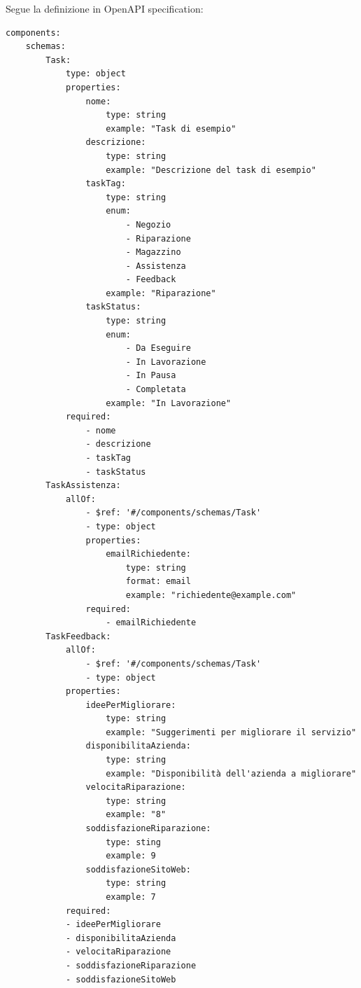 \documentclass{report}
\begin{document}
Segue la definizione in OpenAPI specification:

\begin{verbatim}
components:
	schemas:
	    Task:
	        type: object
	        properties:
	            nome:
	                type: string
	                example: "Task di esempio"
	            descrizione:
	                type: string
	                example: "Descrizione del task di esempio"
	            taskTag:
	                type: string
	                enum:
	                    - Negozio
	                    - Riparazione
	                    - Magazzino
	                    - Assistenza
	                    - Feedback
	                example: "Riparazione"
	            taskStatus:
	                type: string
	                enum:
	                    - Da Eseguire
	                    - In Lavorazione
	                    - In Pausa
	                    - Completata
	                example: "In Lavorazione"
	        required:
	            - nome
	            - descrizione
	            - taskTag
	            - taskStatus
	    TaskAssistenza:
	        allOf:
	            - $ref: '#/components/schemas/Task'
	            - type: object
	            properties:
	                emailRichiedente:
	                    type: string
	                    format: email
	                    example: "richiedente@example.com"
	            required:
	                - emailRichiedente
	    TaskFeedback:
	        allOf:
	            - $ref: '#/components/schemas/Task'
	            - type: object
	        properties:
	            ideePerMigliorare:
	                type: string
	                example: "Suggerimenti per migliorare il servizio"
	            disponibilitaAzienda:
	                type: string
	                example: "Disponibilità dell'azienda a migliorare"
	            velocitaRiparazione:
	                type: string
	                example: "8"
	            soddisfazioneRiparazione:
	                type: sting
	                example: 9
	            soddisfazioneSitoWeb:
	                type: string
	                example: 7
	        required:
	        - ideePerMigliorare
	        - disponibilitaAzienda
	        - velocitaRiparazione
	        - soddisfazioneRiparazione
	        - soddisfazioneSitoWeb
	   

\end{verbatim}
\end{document}
